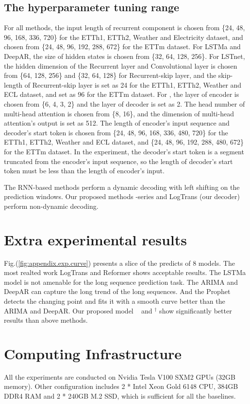 \begin{appendices}
\subsection{The hyperparameter tuning range}
\label{sec:appendix.range}
For all methods, the input length of recurrent component is chosen from \{24, 48, 96, 168, 336, 720\} for the ETTh1, ETTh2, Weather and Electricity dataset, and chosen from \{24, 48, 96, 192, 288, 672\} for the ETTm dataset. 
For LSTMa and DeepAR, the size of hidden states is chosen from \{32, 64, 128, 256\}. 
For LSTnet, the hidden dimension of the Recurrent layer and Convolutional layer is chosen from \{64, 128, 256\} and \{32, 64, 128\} for Recurrent-skip layer, and the skip-length of Recurrent-skip layer is set as 24 for the ETTh1, ETTh2, Weather and ECL dataset, and set as 96 for the ETTm dataset.
For {\mn}, the layer of encoder is chosen from \{6, 4, 3, 2\} and the layer of decoder is set as 2. The head number of multi-head attention is chosen from \{8, 16\}, and the dimension of multi-head attention’s output is set as 512. The length of encoder’s input sequence and decoder’s start token is chosen from \{24, 48, 96, 168, 336, 480, 720\} for the ETTh1, ETTh2, Weather and ECL dataset, and \{24, 48, 96, 192, 288, 480, 672\} for the ETTm dataset. In the experiment, the decoder’s start token is a segment truncated from the encoder’s input sequence, so the length of decoder’s start token must be less than the length of encoder’s input.

The RNN-based methods perform a dynamic decoding with left shifting on the prediction windows. Our proposed methods \mn-series and LogTrans (our decoder) perform non-dynamic decoding.

\section{Extra experimental results}

Fig.(\ref{fig:appendix.exp.curve}) presents a slice of the predicts of 8 models. The most realted work LogTrans and Reformer shows acceptable results. The LSTMa model is not amenable for the long sequence prediction task. The ARIMA and DeepAR can capture the long trend of the long sequences. And the Prophet detects the changing point and fits it with a smooth curve better than the ARIMA and DeepAR. Our proposed model \mn~ and \mn$^{\dag}$ show significantly better results than above methods.

\section{Computing Infrastructure}
All the experiments are conducted on Nvidia Tesla V100 SXM2 GPUs (32GB memory). Other configuration includes 2 * Intel Xeon Gold 6148 CPU, 384GB DDR4 RAM and 2 * 240GB M.2 SSD, which is sufficient for all the baselines. 

\end{appendices}

